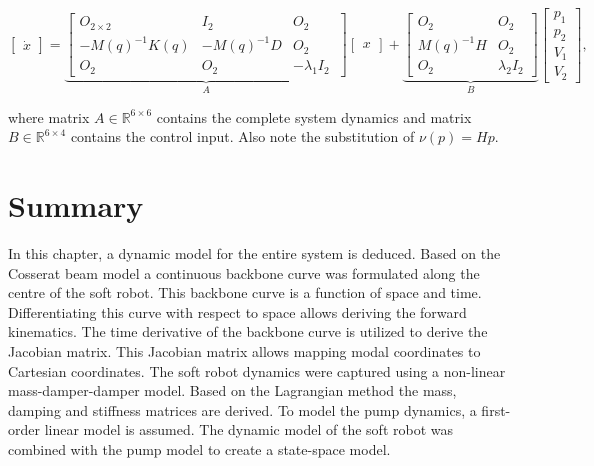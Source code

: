 \begin{equation}
     \begin{bmatrix} \dot{x}  \end{bmatrix}   =   \underbrace{ \begin{bmatrix} O_{2\times 2} & I_{2} & O_{2} \\ -M(q)^{-1}K(q)  & -M(q)^{-1} D & O_{2} \\
     O_{2} & O_{2}    & -\lambda_1 I_{2}\ \end{bmatrix}   }_A   \begin{bmatrix} x \end{bmatrix}  + \underbrace{      \begin{bmatrix} O_{2} & O_{2} \\ M(q)^{-1}H & O_{2} \\ O_{2} & \lambda_2 I_{2} \end{bmatrix} }_B      \begin{bmatrix} p_1 \\ p_2  \\ V_1 \\ V_2 \end{bmatrix},
     \label{eq:ssp}
\end{equation}

where matrix $A \in \mathbb{R}^{6\times 6}$ contains the complete system dynamics and matrix $B \in \mathbb{R}^{6\times 4}$ contains the control input. Also note the substitution of $\nu(p) = Hp$.



\section*{Summary}

In this chapter, a dynamic model for the entire system is deduced. Based on the Cosserat beam model a continuous backbone curve was formulated along the centre of the soft robot. This backbone curve is a function of space and time. Differentiating this curve with respect to space allows deriving the forward kinematics. The time derivative of the backbone curve is utilized to derive the Jacobian matrix. This Jacobian matrix allows mapping modal coordinates to Cartesian coordinates. The soft robot dynamics were captured using a non-linear mass-damper-damper model. Based on the Lagrangian method the mass, damping and stiffness matrices are derived. To model the pump dynamics, a first-order linear model is assumed. The dynamic model of the soft robot was combined with the pump model to create a state-space model. 
